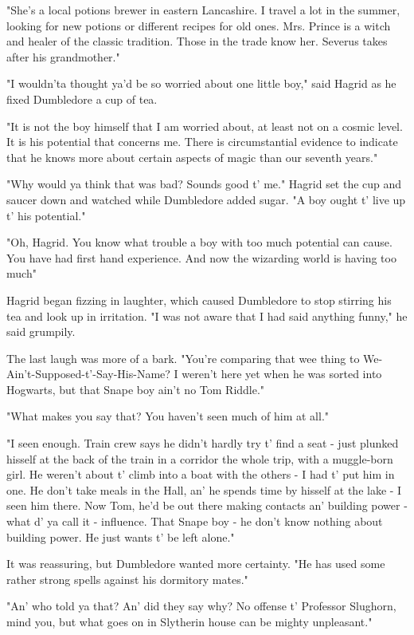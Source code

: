 "She's a local potions brewer in eastern Lancashire. I travel a lot in the summer, looking for new potions or different recipes for old ones. Mrs. Prince is a witch and healer of the classic tradition. Those in the trade know her. Severus takes after his grandmother."

"I wouldn'ta thought ya'd be so worried about one little boy," said Hagrid as he fixed Dumbledore a cup of tea.

"It is not the boy himself that I am worried about, at least not on a cosmic level. It is his potential that concerns me. There is circumstantial evidence to indicate that he knows more about certain aspects of magic than our seventh years."

"Why would ya think that was bad? Sounds good t' me." Hagrid set the cup and saucer down and watched while Dumbledore added sugar. "A boy ought t' live up t' his potential."

"Oh, Hagrid. You know what trouble a boy with too much potential can cause. You have had first hand experience. And now the wizarding world is having too much{\el}"

Hagrid began fizzing in laughter, which caused Dumbledore to stop stirring his tea and look up in irritation. "I was not aware that I had said anything funny," he said grumpily.

The last laugh was more of a bark. "You're comparing that wee thing to We-Ain't-Supposed-t'-Say-His-Name? I weren't here yet when he was sorted into Hogwarts, but that Snape boy ain't no Tom Riddle."

"What makes you say that? You haven't seen much of him at all."

"I seen enough. Train crew says he didn't hardly try t' find a seat - just plunked hisself at the back of the train in a corridor the whole trip, with a muggle-born girl. He weren't about t' climb into a boat with the others - I had t' put him in one. He don't take meals in the Hall, an' he spends time by hisself at the lake - I seen him there. Now Tom, he'd be out there making contacts an' building power - what d' ya call it - influence. That Snape boy - he don't know nothing about building power. He just wants t' be left alone."

It was reassuring, but Dumbledore wanted more certainty. "He has used some rather strong spells against his dormitory mates."

"An' who told ya that? An' did they say why? No offense t' Professor Slughorn, mind you, but what goes on in Slytherin house can be mighty unpleasant."


